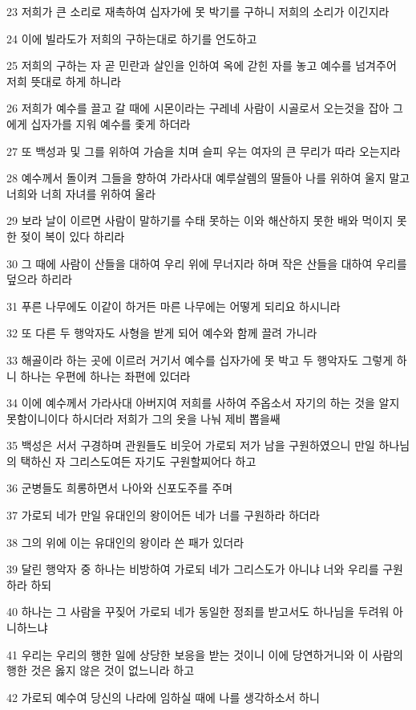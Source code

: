 \par 23 저희가 큰 소리로 재촉하여 십자가에 못 박기를 구하니 저희의 소리가 이긴지라
\par 24 이에 빌라도가 저희의 구하는대로 하기를 언도하고
\par 25 저희의 구하는 자 곧 민란과 살인을 인하여 옥에 갇힌 자를 놓고 예수를 넘겨주어 저희 뜻대로 하게 하니라
\par 26 저희가 예수를 끌고 갈 때에 시몬이라는 구레네 사람이 시골로서 오는것을 잡아 그에게 십자가를 지워 예수를 좇게 하더라
\par 27 또 백성과 및 그를 위하여 가슴을 치며 슬피 우는 여자의 큰 무리가 따라 오는지라
\par 28 예수께서 돌이켜 그들을 향하여 가라사대 예루살렘의 딸들아 나를 위하여 울지 말고 너희와 너희 자녀를 위하여 울라
\par 29 보라 날이 이르면 사람이 말하기를 수태 못하는 이와 해산하지 못한 배와 먹이지 못한 젖이 복이 있다 하리라
\par 30 그 때에 사람이 산들을 대하여 우리 위에 무너지라 하며 작은 산들을 대하여 우리를 덮으라 하리라
\par 31 푸른 나무에도 이같이 하거든 마른 나무에는 어떻게 되리요 하시니라
\par 32 또 다른 두 행악자도 사형을 받게 되어 예수와 함께 끌려 가니라
\par 33 해골이라 하는 곳에 이르러 거기서 예수를 십자가에 못 박고 두 행악자도 그렇게 하니 하나는 우편에 하나는 좌편에 있더라
\par 34 이에 예수께서 가라사대 아버지여 저희를 사하여 주옵소서 자기의 하는 것을 알지 못함이니이다 하시더라 저희가 그의 옷을 나눠 제비 뽑을쌔
\par 35 백성은 서서 구경하며 관원들도 비웃어 가로되 저가 남을 구원하였으니 만일 하나님의 택하신 자 그리스도여든 자기도 구원할찌어다 하고
\par 36 군병들도 희롱하면서 나아와 신포도주를 주며
\par 37 가로되 네가 만일 유대인의 왕이어든 네가 너를 구원하라 하더라
\par 38 그의 위에 이는 유대인의 왕이라 쓴 패가 있더라
\par 39 달린 행악자 중 하나는 비방하여 가로되 네가 그리스도가 아니냐 너와 우리를 구원하라 하되
\par 40 하나는 그 사람을 꾸짖어 가로되 네가 동일한 정죄를 받고서도 하나님을 두려워 아니하느냐
\par 41 우리는 우리의 행한 일에 상당한 보응을 받는 것이니 이에 당연하거니와 이 사람의 행한 것은 옳지 않은 것이 없느니라 하고
\par 42 가로되 예수여 당신의 나라에 임하실 때에 나를 생각하소서 하니
